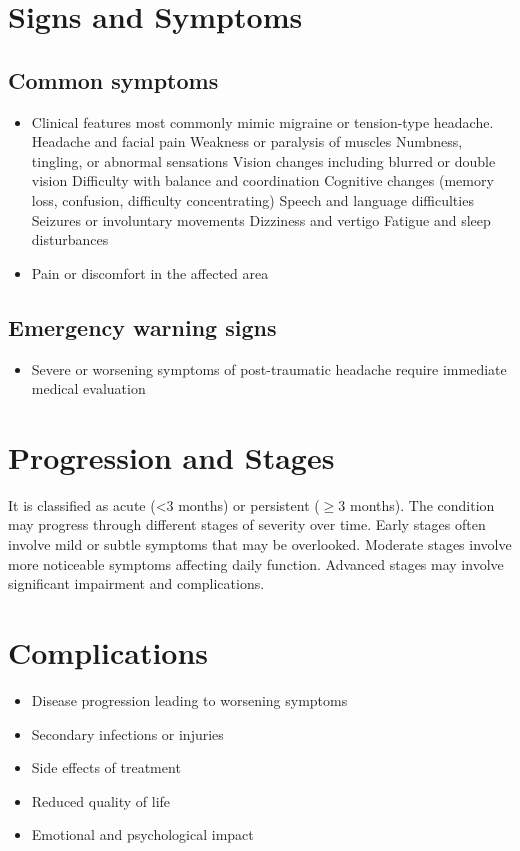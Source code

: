 \section{Signs and Symptoms}
\subsection{Common symptoms}
\begin{itemize}[noitemsep]
  \item Clinical features most commonly mimic migraine or tension-type headache. Headache and facial pain Weakness or paralysis of muscles Numbness, tingling, or abnormal sensations Vision changes including blurred or double vision Difficulty with balance and coordination Cognitive changes (memory loss, confusion, difficulty concentrating) Speech and language difficulties Seizures or involuntary movements Dizziness and vertigo Fatigue and sleep disturbances
  \item Pain or discomfort in the affected area
  \end{itemize}
\subsection{Emergency warning signs}
\begin{itemize}[noitemsep]
  \item Severe or worsening symptoms of post-traumatic headache require immediate medical evaluation
\end{itemize}
\section{Progression and Stages}
It is classified as acute (<3 months) or persistent ($\ge$3 months). The condition may progress through different stages of severity over time. Early stages often involve mild or subtle symptoms that may be overlooked. Moderate stages involve more noticeable symptoms affecting daily function. Advanced stages may involve significant impairment and complications.
\section{Complications}
\begin{itemize}[noitemsep]
  \item Disease progression leading to worsening symptoms
  \item Secondary infections or injuries
  \item Side effects of treatment
  \item Reduced quality of life
  \item Emotional and psychological impact
\end{itemize}

